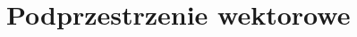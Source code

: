 \documentclass[a5paper,8pt]{article}
\newtheorem{example}{Przykład}[section]
\newtheorem{lemat}{Lemat}[section]
\newtheorem{definition}{Definicja}[section]
\newtheorem{theorem}{Twierdzenie}[section]
\begin{document}



    \section{Podprzestrzenie wektorowe} %
    \label{sec:podprzestrzenie_wektorowe}




















\end{document}

